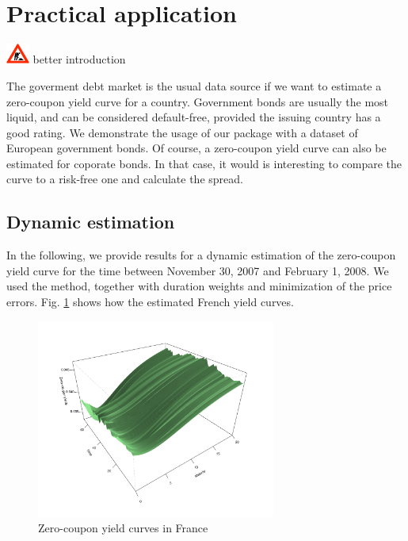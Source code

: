 \section{Practical application}
\label{sec:pract-appl}

\includegraphics[width=0.3in]{baustelle} better introduction

The goverment debt market is the usual data source if we want to estimate a zero-coupon yield curve for a country. Government bonds are usually the most liquid, and can be considered default-free, provided the issuing country has a good rating. We demonstrate the usage of our package with a dataset of European government bonds. Of course, a zero-coupon yield curve can also be estimated for coporate bonds. In that case, it would is interesting to compare the curve to a risk-free one and calculate the spread.




\subsection{Dynamic estimation}

In the following, we provide results for a dynamic estimation of the zero-coupon yield curve for the time between November 30, 2007 and February 1, 2008. We used the \cite{Svensson1994} method, together with duration weights and minimization of the price errors. Fig. \ref{fig:3dplot} shows how the estimated French yield curves.

\begin{figure}[htb]
  \begin{center}
  \caption{Zero-coupon yield curves in France}
  \label{fig:3dplot}
\includegraphics[width=0.7\textwidth]{3dplot}
\end{center}
\end{figure}


